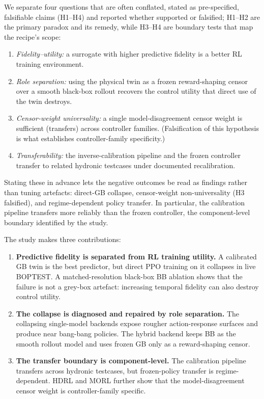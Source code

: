 \documentclass[a4paper,fleqn]{cas-sc}
\begin{document}
We separate four questions that are often conflated, stated as pre-specified, falsifiable claims (H1--H4) and reported whether supported or falsified; H1--H2 are the primary paradox and its remedy, while H3--H4 are boundary tests that map the recipe's scope:
\begin{enumerate}[label=\textbf{H\arabic*.},leftmargin=2.6em]
 \item \emph{Fidelity--utility:} a surrogate with higher predictive fidelity is a better RL training environment.
 \item \emph{Role separation:} using the physical twin as a frozen reward-shaping censor over a smooth black-box rollout recovers the control utility that direct use of the twin destroys.
 \item \emph{Censor-weight universality:} a single model-disagreement censor weight is sufficient (transfers) across controller families. (Falsification of this hypothesis is what establishes controller-family specificity.)
 \item \emph{Transferability:} the inverse-calibration pipeline and the frozen controller transfer to related hydronic testcases under documented recalibration.
\end{enumerate}
Stating these in advance lets the negative outcomes be read as findings rather than tuning artefacts: direct-GB collapse, censor-weight non-universality (H3 falsified), and regime-dependent policy transfer. In particular, the calibration pipeline transfers more reliably than the frozen controller, the component-level boundary identified by the study.

The study makes three contributions:
\begin{enumerate}
 \item \textbf{Predictive fidelity is separated from RL training utility.} A calibrated GB twin is the best predictor, but direct PPO training on it collapses in live BOPTEST. A matched-resolution black-box BB ablation shows that the failure is not a grey-box artefact: increasing temporal fidelity can also destroy control utility.
 \item \textbf{The collapse is diagnosed and repaired by role separation.} The collapsing single-model backends expose rougher action-response surfaces and produce near bang-bang policies. The hybrid backend keeps BB as the smooth rollout model and uses frozen GB only as a reward-shaping censor.
 \item \textbf{The transfer boundary is component-level.} The calibration pipeline transfers across hydronic testcases, but frozen-policy transfer is regime-dependent. HDRL and MORL further show that the model-disagreement censor weight is controller-family specific.
\end{enumerate}
\end{document}
